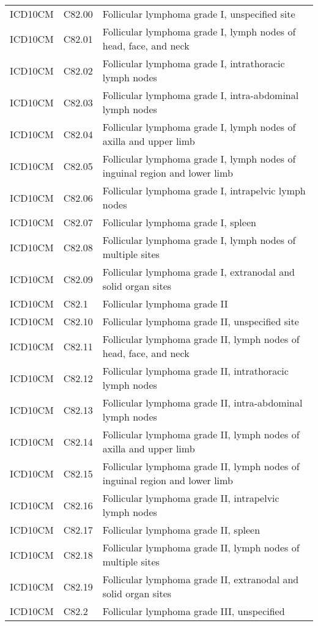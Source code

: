 \begin{table}[ht]
\begin{tabular}{lll}
  ICD10CM & C82.00 & Follicular lymphoma grade I, unspecified site \\ 
  ICD10CM & C82.01 & Follicular lymphoma grade I, lymph nodes of head, face, and neck \\ 
  ICD10CM & C82.02 & Follicular lymphoma grade I, intrathoracic lymph nodes \\ 
  ICD10CM & C82.03 & Follicular lymphoma grade I, intra-abdominal lymph nodes \\ 
  ICD10CM & C82.04 & Follicular lymphoma grade I, lymph nodes of axilla and upper limb \\ 
  ICD10CM & C82.05 & Follicular lymphoma grade I, lymph nodes of inguinal region and lower limb \\ 
  ICD10CM & C82.06 & Follicular lymphoma grade I, intrapelvic lymph nodes \\ 
  ICD10CM & C82.07 & Follicular lymphoma grade I, spleen \\ 
  ICD10CM & C82.08 & Follicular lymphoma grade I, lymph nodes of multiple sites \\ 
  ICD10CM & C82.09 & Follicular lymphoma grade I, extranodal and solid organ sites \\ 
  ICD10CM & C82.1 & Follicular lymphoma grade II \\ 
  ICD10CM & C82.10 & Follicular lymphoma grade II, unspecified site \\ 
  ICD10CM & C82.11 & Follicular lymphoma grade II, lymph nodes of head, face, and neck \\ 
  ICD10CM & C82.12 & Follicular lymphoma grade II, intrathoracic lymph nodes \\ 
  ICD10CM & C82.13 & Follicular lymphoma grade II, intra-abdominal lymph nodes \\ 
  ICD10CM & C82.14 & Follicular lymphoma grade II, lymph nodes of axilla and upper limb \\ 
  ICD10CM & C82.15 & Follicular lymphoma grade II, lymph nodes of inguinal region and lower limb \\ 
  ICD10CM & C82.16 & Follicular lymphoma grade II, intrapelvic lymph nodes \\ 
  ICD10CM & C82.17 & Follicular lymphoma grade II, spleen \\ 
  ICD10CM & C82.18 & Follicular lymphoma grade II, lymph nodes of multiple sites \\ 
  ICD10CM & C82.19 & Follicular lymphoma grade II, extranodal and solid organ sites \\ 
  ICD10CM & C82.2 & Follicular lymphoma grade III, unspecified \\ 

\end{tabular}
\end{table}
